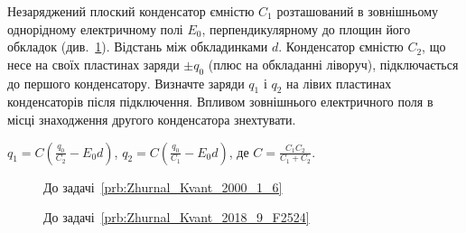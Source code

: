 \begin{problem}\label{prb:Zhurnal_Kvant_2018_9_F2524}
    Незаряджений плоский конденсатор ємністю $C_1$ розташований в зовнішньому однорідному електричному полі $E_0$, перпендикулярному до площин його обкладок (див.~\ref{Zhurnal_Kvant_2018_9_F2524}). Відстань між обкладинками $d$. Конденсатор ємністю $C_2$, що несе на своїх пластинах заряди $\pm q_0$ (плюс на обкладанні ліворуч), підключається до першого конденсатору. Визначте заряди $q_1$ і $q_2$ на лівих пластинах конденсаторів після підключення. Впливом зовнішнього електричного поля в місці знаходження другого конденсатора знехтувати.
\begin{solution}
	$q_1 = C\left( \frac{q_0}{C_2} - E_0 d\right) $,
	$q_2 = C\left( \frac{q_0}{C_1} - E_0 d\right) $, де $C = \frac{C_1C_2}{C_1 + C_2}$.
\end{solution}
\end{problem}

\begin{figure}[h!]\centering
\begin{minipage}[t]{0.45\linewidth}\centering
\caption{До задачі~\ref{prb:Zhurnal_Kvant_2000_1_6}}
\label{Zhurnal_Kvant_2000_1_6}
\end{minipage}
\begin{minipage}[t]{0.45\linewidth}\centering
\caption{До задачі~\ref{prb:Zhurnal_Kvant_2018_9_F2524}}
\label{Zhurnal_Kvant_2018_9_F2524}
\end{minipage}
\end{figure}



